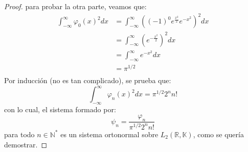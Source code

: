 \documentclass[12pt]{report}
\theoremstyle{largebreak}
\begin{document}
\begin{proof}
        para probar la otra parte, veamos que:
        \begin{equation*}
            \begin{split}
                \int_{-\infty}^\infty\varphi_0(x)^2dx&=\int_{-\infty}^\infty\left((-1)^0e^{\frac{x^2}{2}}e^{-x^2}\right)^2 dx\\
                &=\int_{-\infty}^\infty\left(e^{-\frac{x^2}{2}}\right)^2 dx\\
                &=\int_{-\infty}^\infty e^{-x^2} dx\\
                &=\pi^{1/2}\\
            \end{split}
        \end{equation*}
        Por inducción (no es tan complicado), se prueba que:
        \begin{equation*}
            \int_{ -\infty}^\infty\varphi_n(x)^2dx=\pi^{1/2}2^n n!
        \end{equation*}
        con lo cual, el sistema formado por:
        \begin{equation*}
            \psi_n=\frac{\varphi_n}{\pi^{1/2}2^n n!}
        \end{equation*}
        para todo $n\in\mathbb{N}^*$ es un sistema ortonormal sobre $L_2(\mathbb{R},\mathbb{K})$, como se quería demostrar.

    \end{proof}
\end{document}
